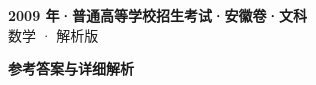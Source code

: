 \documentclass[zihao=-4, a4paper]{ctexart}
\begin{document}
\begin{center}
  {\Large\bfseries 2009 年·普通高等学校招生考试·安徽卷·文科}\\[4pt]
  {\large 数学 · 解析版}
\end{center}
\medskip
{}

\clearpage
{}
\begin{center}{\Large\bfseries 参考答案与详细解析}\end{center}
\medskip

\end{document}
